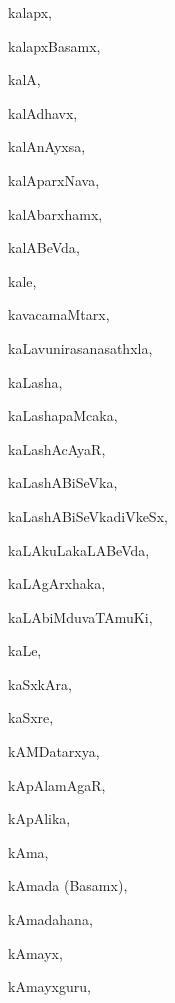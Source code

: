 \begin{multicols}{3}
{\noindent
{kalapx}, \pageref{kalapx}

\noindent
{kalapxBasamx}, \pageref{kalapxBasamx}

\noindent
{kalA}, \pageref{kalA}

\noindent
{kalAdhavx}, \pageref{kalAdhavx}

\noindent
{kalAnAyxsa}, \pageref{kalAnAyxsa}

\noindent
{kalAparxNava}, \pageref{kalAparxNava}

\noindent
{kalAbarxhamx}, \pageref{kalAbarxhamx}

\noindent
{kalABeVda}, \pageref{kalABeVda}

\noindent
{kale}, \pageref{kale}

\noindent
{kavacamaMtarx}, \pageref{kavacamaMtarx}

\noindent
{kaLavunirasanasathxla}, \pageref{kaLavunirasanasathxla}

\noindent
{kaLasha}, \pageref{kaLasha}

\noindent
{kaLashapaMcaka}, \pageref{kaLashapaMcaka}

\noindent
{kaLashAcAyaR}, \pageref{kaLashAcAyaR}

\noindent
{kaLashABiSeVka}, \pageref{kaLashABiSeVka}

\noindent
{kaLashABiSeVkadiVkeSx}, \pageref{kaLashABiSeVkadiVkeSx}

\noindent
{kaLAkuLakaLABeVda}, \pageref{kaLAkuLakaLABeVda}

\noindent
{kaLAgArxhaka}, \pageref{kaLAgArxhaka}

\noindent
{kaLAbiMduvaTAmuKi}, \pageref{kaLAbiMduvaTAmuKi}

\noindent
{kaLe}, \pageref{kaLe}

\noindent
{kaSxkAra}, \pageref{kaSxkAra}

\noindent
{kaSxre}, \pageref{kaSxre}

\noindent
{kAMDatarxya}, \pageref{kAMDatarxya}

\noindent
{kApAlamAgaR}, \pageref{kApAlamAgaR}

\noindent
{kApAlika}, \pageref{kApAlika}

\noindent
{kAma}, \pageref{kAma}

\noindent
{kAmada (Basamx)}, \pageref{kAmada (Basamx)}

\noindent
{kAmadahana}, \pageref{kAmadahana}

\noindent
{kAmayx}, \pageref{kAmayx}

\noindent
{kAmayxguru}, \pageref{kAmayxguru}

}
\end{multicols}
